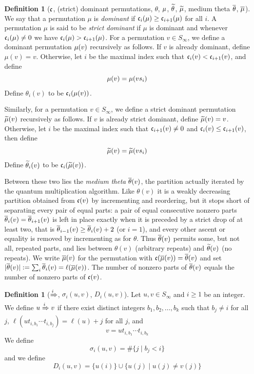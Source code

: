 \documentclass{amsart}
\theoremstyle{definition}
\newtheorem{definition}[lemma]{Definition}
\theoremstyle{remark}
\numberwithin{equation}{section}
\begin{document}
\begin{definition}[$\mathfrak{c}$, (strict) dominant permutations, $\theta$, $\mu$, $\widetilde{\theta}$, $\widetilde{\mu}$, medium theta $\overline{\theta}$, $\overline{\mu}$] \label{def:codetheta}
We say that a permutation $\mu$ is \emph{dominant} if $\mathfrak{c}_i(\mu)\geq \mathfrak{c}_{i+1}(\mu)$ for all $i$. A permutation $\mu$ is said to be \emph{strict dominant} if $\mu$ is dominant and whenever $\mathfrak{c}_i(\mu)\neq 0$ we have $\mathfrak{c}_i(\mu)>\mathfrak{c}_{i+1}(\mu)$. For a permutation $v\in S_\infty$, we define a dominant permutation $\mu(v)$ recursively as follows. If $v$ is already dominant, define $\mu(v)=v$. Otherwise, let $i$ be the maximal index such that $\mathfrak{c}_i(v)<\mathfrak{c}_{i+1}(v)$, and define
$$\mu(v)=\mu(vs_i)$$
Define $\theta_i(v)$ to be $\mathfrak{c}_i(\mu(v))$.

Similarly, for a permutation $v\in S_\infty$, we define a strict dominant permutation $\widetilde{\mu}(v)$ recursively as follows. If $v$ is already strict dominant, define $\widetilde{\mu}(v)=v$. Otherwise, let $i$ be the maximal index such that $\mathfrak{c}_{i+1}(v)\neq 0$ and $\mathfrak{c}_i(v)\leq \mathfrak{c}_{i+1}(v)$, then define
$$\widetilde{\mu}(v)=\widetilde{\mu}(vs_i)$$
Define $\widetilde{\theta}_i(v)$ to be $\mathfrak{c}_i(\widetilde{\mu}(v))$.

Between these two lies the \emph{medium theta} $\overline{\theta}(v)$, the partition actually iterated by the quantum multiplication algorithm. Like $\theta(v)$ it is a weakly decreasing partition obtained from $\mathfrak{c}(v)$ by incrementing and reordering, but it stops short of separating every pair of equal parts: a pair of equal consecutive nonzero parts $\overline{\theta}_i(v)=\overline{\theta}_{i+1}(v)$ is left in place exactly when it is preceded by a strict drop of at least two, that is $\overline{\theta}_{i-1}(v)\geq\overline{\theta}_i(v)+2$ (or $i=1$), and every other ascent or equality is removed by incrementing as for $\theta$. Thus $\overline{\theta}(v)$ permits some, but not all, repeated parts, and lies between $\theta(v)$ (arbitrary repeats) and $\widetilde{\theta}(v)$ (no repeats). We write $\overline{\mu}(v)$ for the permutation with $\mathfrak{c}(\overline{\mu}(v))=\overline{\theta}(v)$ and set $|\overline{\theta}(v)|:=\sum_i\overline{\theta}_i(v)=\ell(\overline{\mu}(v))$. The number of nonzero parts of $\overline{\theta}(v)$ equals the number of nonzero parts of $\mathfrak{c}(v)$.
\end{definition}

\begin{definition}[$\xRightarrow{i}$, $\sigma_i(u,v)$, $D_i(u,v)$]
Let $u,v\in S_\infty$ and $i\geq 1$ be an integer. We define $u\xRightarrow{i} v$ if there exist distinct integers $b_1,b_2,\ldots,b_k$ such that $b_j\neq i$ for all $j$, $\ell(ut_{i,b_1}\cdots t_{i,b_j})=\ell(u)+j$ for all $j$, and 
$$v=ut_{i,b_1}\cdots t_{i,b_k}$$
We define
$$\sigma_i(u,v)=\#\{j\mid b_j<i\}$$
and we define
$$D_i(u,v)=\{u(i)\}\cup\{u(j)\mid u(j)\neq v(j)\}$$
\end{definition}
\end{document}
